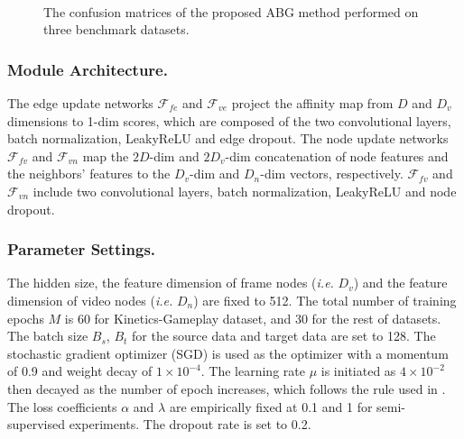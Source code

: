 \begin{figure}[t]
    \centering
    \\
    \caption{The confusion matrices of the proposed ABG method performed on three benchmark datasets.}
    \label{fig:cf}\vspace{-0.7cm}
\end{figure}


\subsubsection{Module Architecture.}
The edge update networks $\mathcal{F}_{fe}$ and $\mathcal{F}_{ve}$ project the affinity map from $D$ and $D_v$ dimensions to 1-dim scores, which are composed of the two convolutional layers, batch normalization, LeakyReLU and edge dropout. The node update networks $\mathcal{F}_{fv}$ and $\mathcal{F}_{vn}$ map the $2D$-dim and $2D_v$-dim concatenation of node features and the neighbors' features to the $D_v$-dim and $D_n$-dim vectors, respectively. $\mathcal{F}_{fv}$ and $\mathcal{F}_{vn}$ include two convolutional layers, batch normalization, LeakyReLU and node dropout.


\subsubsection{Parameter Settings.}
 The hidden size, the feature dimension of frame nodes (\textit{i.e.} $D_v$) and the feature dimension of video nodes (\textit{i.e.} $D_n$) are fixed to 512. The total number of training epochs $M$ is 60 for Kinetics-Gameplay dataset, and 30 for the rest of datasets. The batch size $B_s$, $B_t$ for the source data and target data are set to 128. The stochastic gradient optimizer (SGD) is used as the optimizer with a momentum of 0.9 and weight decay of $1\times10^{-4}$. The learning rate $\mu$ is initiated as $4\times10^{-2}$ then decayed as the number of epoch increases, which follows the rule used in \cite{DANN,TAN}. The loss coefficients $\alpha$ and $\lambda$ are empirically fixed at 0.1 and 1 for semi-supervised experiments. The dropout rate is set to 0.2.



